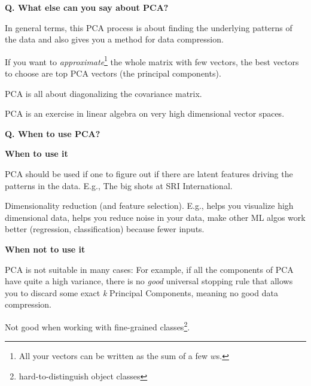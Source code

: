 \begin{frame}[fragile]{\textbf{Q. What else can you say about PCA?}}
  \begin{wideitemize}
    \item In general terms, this PCA process is about finding the underlying
    patterns of the data and also gives you a method for data compression.\medskip
    \begin{wideitemize}
      \item If you want to \textit{approximate}\footnote{All your vectors can be written as the sum of a few $w$s.} the whole matrix with few vectors, the best vectors to choose are top PCA vectors (the principal components).
    \end{wideitemize}
    \item PCA is all about diagonalizing the covariance matrix.
    \begin{wideitemize}
      \item PCA is an exercise in linear algebra on very high dimensional vector spaces.
    \end{wideitemize}
  \end{wideitemize}
\end{frame}


\begin{frame}[fragile]{\textbf{Q. When to use PCA?}}
  \vspace{.4em}
  \begin{wideitemize}
    \item \textbf{When to use it}
    \begin{wideitemize}
      \item PCA should be used if one to figure out if there are latent features
      driving the patterns in the data. E.g., The big shots at SRI International.
      \item Dimensionality reduction (and feature selection). E.g., helps you
      visualize high dimensional data, helps you reduce noise in your data, make
      other ML algos work better (regression, classification) because fewer inputs.
    \end{wideitemize}
    \item \textbf{When not to use it}
    \begin{wideitemize}
      \item PCA is not suitable in many cases: For example, if all the components of PCA
      have quite a high variance, there is no \textit{good} universal stopping rule that
      allows you to discard some exact \textit{k} Principal Components, meaning no good
      data compression.
      \item Not good when working with fine-grained classes\footnote{hard-to-distinguish object classes}.
    \end{wideitemize}
  \end{wideitemize}
\end{frame}


